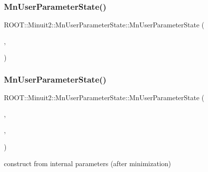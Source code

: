 \subsubsection{\texorpdfstring{MnUserParameterState()}{MnUserParameterState()}\hspace{0.1cm}{\footnotesize\ttfamily [14/24]}}
{\footnotesize\ttfamily R\+O\+O\+T\+::\+Minuit2\+::\+Mn\+User\+Parameter\+State\+::\+Mn\+User\+Parameter\+State (\begin{DoxyParamCaption}\item[{const \mbox{\hyperlink{classROOT_1_1Minuit2_1_1MnUserParameters}{Mn\+User\+Parameters}} \&}]{,  }\item[{const \mbox{\hyperlink{classROOT_1_1Minuit2_1_1MnUserCovariance}{Mn\+User\+Covariance}} \&}]{ }\end{DoxyParamCaption})}

\mbox{\label{classROOT_1_1Minuit2_1_1MnUserParameterState_a8214c3f41958849f1aaae4865bb5b129}} 
\subsubsection{\texorpdfstring{MnUserParameterState()}{MnUserParameterState()}\hspace{0.1cm}{\footnotesize\ttfamily [15/24]}}
{\footnotesize\ttfamily R\+O\+O\+T\+::\+Minuit2\+::\+Mn\+User\+Parameter\+State\+::\+Mn\+User\+Parameter\+State (\begin{DoxyParamCaption}\item[{const \mbox{\hyperlink{classROOT_1_1Minuit2_1_1MinimumState}{Minimum\+State}} \&}]{,  }\item[{double}]{,  }\item[{const \mbox{\hyperlink{classROOT_1_1Minuit2_1_1MnUserTransformation}{Mn\+User\+Transformation}} \&}]{ }\end{DoxyParamCaption})}



construct from internal parameters (after minimization) 

\mbox{\label{classROOT_1_1Minuit2_1_1MnUserParameterState_a3a5a64a086b883f61febd02676c0d151}} 
